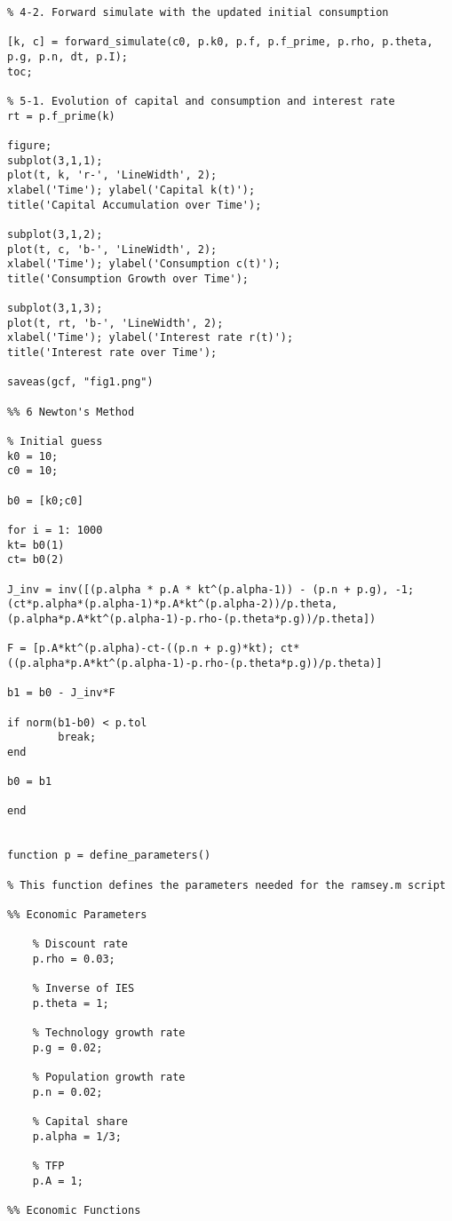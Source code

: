 \begin{lstlisting}
% 4-2. Forward simulate with the updated initial consumption

[k, c] = forward_simulate(c0, p.k0, p.f, p.f_prime, p.rho, p.theta, p.g, p.n, dt, p.I);
toc;

% 5-1. Evolution of capital and consumption and interest rate
rt = p.f_prime(k)

figure;
subplot(3,1,1);
plot(t, k, 'r-', 'LineWidth', 2);
xlabel('Time'); ylabel('Capital k(t)');
title('Capital Accumulation over Time');

subplot(3,1,2);
plot(t, c, 'b-', 'LineWidth', 2);
xlabel('Time'); ylabel('Consumption c(t)');
title('Consumption Growth over Time');

subplot(3,1,3);
plot(t, rt, 'b-', 'LineWidth', 2);
xlabel('Time'); ylabel('Interest rate r(t)');
title('Interest rate over Time');

saveas(gcf, "fig1.png")

%% 6 Newton's Method 

% Initial guess
k0 = 10;
c0 = 10;

b0 = [k0;c0]

for i = 1: 1000
kt= b0(1)
ct= b0(2)

J_inv = inv([(p.alpha * p.A * kt^(p.alpha-1)) - (p.n + p.g), -1; (ct*p.alpha*(p.alpha-1)*p.A*kt^(p.alpha-2))/p.theta, (p.alpha*p.A*kt^(p.alpha-1)-p.rho-(p.theta*p.g))/p.theta])

F = [p.A*kt^(p.alpha)-ct-((p.n + p.g)*kt); ct*((p.alpha*p.A*kt^(p.alpha-1)-p.rho-(p.theta*p.g))/p.theta)]

b1 = b0 - J_inv*F

if norm(b1-b0) < p.tol
        break;
end

b0 = b1

end


function p = define_parameters()

% This function defines the parameters needed for the ramsey.m script

%% Economic Parameters

    % Discount rate
    p.rho = 0.03;

    % Inverse of IES 
    p.theta = 1;

    % Technology growth rate
    p.g = 0.02;

    % Population growth rate
    p.n = 0.02;

    % Capital share
    p.alpha = 1/3;

    % TFP
    p.A = 1;

%% Economic Functions
    

\end{lstlisting}

